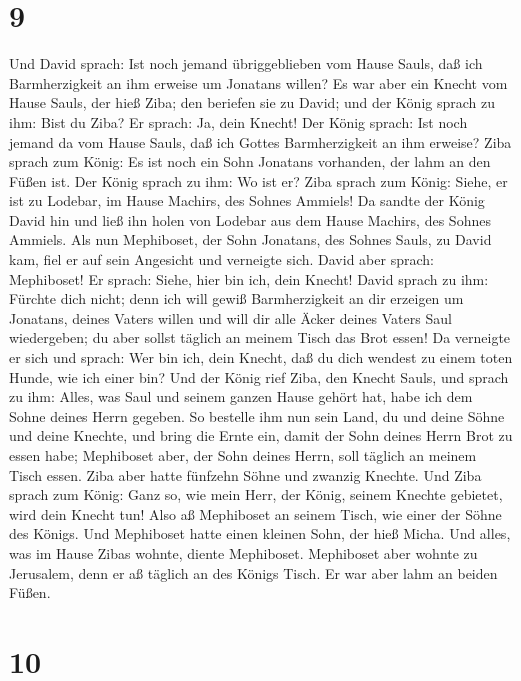 \hypertarget{section-8}{%
\section{9}\label{section-8}}

 Und David sprach: Ist noch jemand übriggeblieben vom
Hause Sauls, daß ich Barmherzigkeit an ihm erweise um Jonatans willen?
 Es war aber ein Knecht vom Hause Sauls, der hieß Ziba;
den beriefen sie zu David; und der König sprach zu ihm: Bist du Ziba? Er
sprach: Ja, dein Knecht!  Der König sprach: Ist noch
jemand da vom Hause Sauls, daß ich Gottes Barmherzigkeit an ihm erweise?
Ziba sprach zum König: Es ist noch ein Sohn Jonatans vorhanden, der lahm
an den Füßen ist.  Der König sprach zu ihm: Wo ist er?
Ziba sprach zum König: Siehe, er ist zu Lodebar, im Hause Machirs, des
Sohnes Ammiels!  Da sandte der König David hin und ließ
ihn holen von Lodebar aus dem Hause Machirs, des Sohnes Ammiels.
 Als nun Mephiboset, der Sohn Jonatans, des Sohnes Sauls,
zu David kam, fiel er auf sein Angesicht und verneigte sich. David aber
sprach: Mephiboset! Er sprach: Siehe, hier bin ich, dein Knecht!
 David sprach zu ihm: Fürchte dich nicht; denn ich will
gewiß Barmherzigkeit an dir erzeigen um Jonatans, deines Vaters willen
und will dir alle Äcker deines Vaters Saul wiedergeben; du aber sollst
täglich an meinem Tisch das Brot essen!  Da verneigte er
sich und sprach: Wer bin ich, dein Knecht, daß du dich wendest zu einem
toten Hunde, wie ich einer bin?  Und der König rief Ziba,
den Knecht Sauls, und sprach zu ihm: Alles, was Saul und seinem ganzen
Hause gehört hat, habe ich dem Sohne deines Herrn gegeben.
 So bestelle ihm nun sein Land, du und deine Söhne und
deine Knechte, und bring die Ernte ein, damit der Sohn deines Herrn Brot
zu essen habe; Mephiboset aber, der Sohn deines Herrn, soll täglich an
meinem Tisch essen. Ziba aber hatte fünfzehn Söhne und zwanzig Knechte.
 Und Ziba sprach zum König: Ganz so, wie mein Herr, der
König, seinem Knechte gebietet, wird dein Knecht tun! Also aß Mephiboset
an seinem Tisch, wie einer der Söhne des Königs.  Und
Mephiboset hatte einen kleinen Sohn, der hieß Micha. Und alles, was im
Hause Zibas wohnte, diente Mephiboset.  Mephiboset aber
wohnte zu Jerusalem, denn er aß täglich an des Königs Tisch. Er war aber
lahm an beiden Füßen.

\hypertarget{section-9}{%
\section{10}\label{section-9}}

